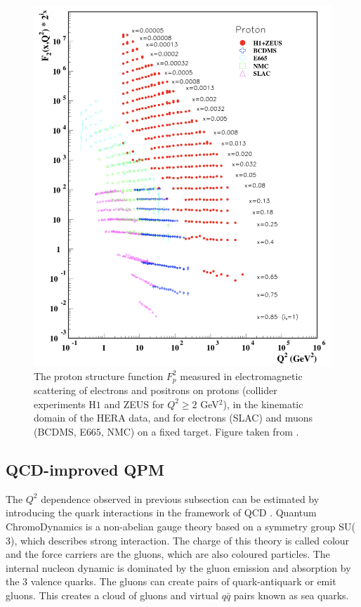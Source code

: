 \begin{figure}[!h]
  \centering
	\includegraphics[scale=0.65]{./gfx/F2.png}
	\caption{The proton structure function $F^2_p$ measured in electromagnetic scattering of electrons and positrons on protons (collider experiments H$1$ and ZEUS for $Q^2 \geq 2$ GeV$^2$), in the kinematic domain of the HERA data, and for electrons (SLAC) and muons (BCDMS, E$665$, NMC) on a fixed target. Figure taken from \cite{PDG}.}
	\label{pic:F2}
\end{figure}

\subsection{QCD-improved QPM}

The $Q^2$ dependence observed in previous subsection can be estimated by introducing the quark interactions in the framework of QCD \cite{DISmeas,PICH}. Quantum ChromoDynamics is a non-abelian gauge theory based on a symmetry group SU($3$), which describes strong interaction. The charge of this theory is called colour and the force carriers are the gluons, which are also coloured particles. The internal nucleon dynamic is dominated by the gluon emission and absorption by the $3$ valence quarks. The gluons can create pairs of quark-antiquark or emit gluons. This creates a cloud of gluons and virtual $q\bar{q}$ pairs known as sea quarks.

